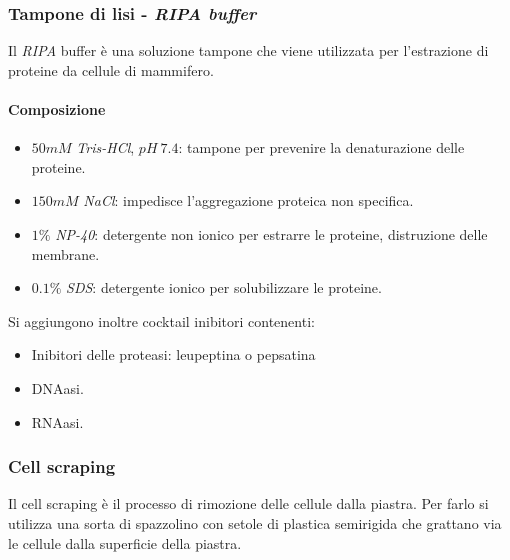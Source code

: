 		\subsubsection{Tampone di lisi - \emph{RIPA buffer}}
		Il \emph{RIPA} buffer \`e una soluzione tampone che viene utilizzata per l'estrazione di proteine da cellule di mammifero.
			
			\paragraph{Composizione}
			\begin{itemize}
				\item $50mM$ \emph{Tris-HCl}, $pH\ 7.4$: tampone per prevenire la denaturazione delle proteine.
				\item $150mM$ \emph{NaCl}: impedisce l'aggregazione proteica non specifica.
				\item $1\%$ \emph{NP-40}: detergente non ionico per estrarre le proteine, distruzione delle membrane.
				\item $0.1\%$ \emph{SDS}: detergente ionico per solubilizzare le proteine.
			\end{itemize}
			Si aggiungono inoltre cocktail inibitori contenenti:
			\begin{itemize}
				\item Inibitori delle proteasi: leupeptina o pepsatina
				\item DNAasi.
				\item RNAasi.
			\end{itemize}

		\subsubsection{Cell scraping}
		Il cell scraping \`e il processo di rimozione delle cellule dalla piastra.
		Per farlo si utilizza una sorta di spazzolino con setole di plastica semirigida che grattano via le cellule dalla superficie della piastra. 

